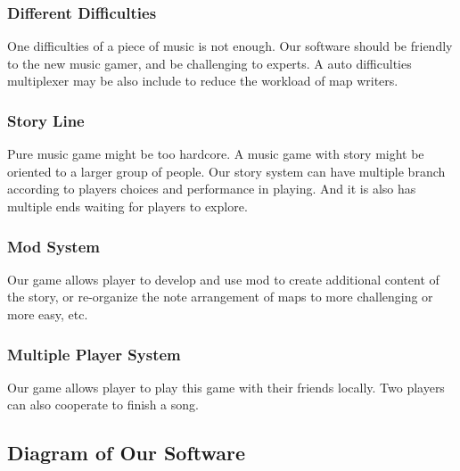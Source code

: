 \documentclass[12pt, a4paper]{article}
\begin{document}
\subsubsection{Different Difficulties}

One difficulties of a piece of music is not enough. Our software should
be friendly to the new music gamer, and be challenging to experts.
A auto difficulties multiplexer may be also include to reduce the workload
of map writers.

\subsubsection{Story Line}

Pure music game might be too hardcore. A music game with story might be
oriented to a larger group of people. Our story system can have
multiple branch according to players choices and performance in playing.
And it is also has multiple ends waiting for players to explore.

\subsubsection{Mod System}

Our game allows player to develop and use mod to create additional
content of the story, or re-organize the note arrangement of maps
to more challenging or more easy, etc.

\subsubsection{Multiple Player System}

Our game allows player to play this game with their friends locally.
Two players can also cooperate to finish a song.

\subsection{Diagram of Our Software}
\end{document}

